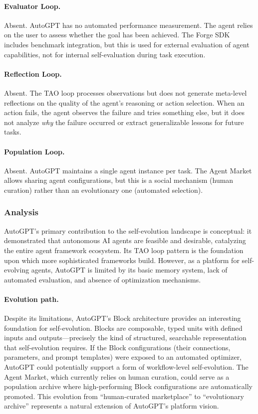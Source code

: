 \paragraph{Evaluator Loop.}
Absent. AutoGPT has no automated performance measurement. The agent relies on the user to assess whether the goal has been achieved. The Forge SDK includes benchmark integration, but this is used for external evaluation of agent capabilities, not for internal self-evaluation during task execution.

\paragraph{Reflection Loop.}
Absent. The TAO loop processes observations but does not generate meta-level reflections on the quality of the agent's reasoning or action selection. When an action fails, the agent observes the failure and tries something else, but it does not analyze \emph{why} the failure occurred or extract generalizable lessons for future tasks.

\paragraph{Population Loop.}
Absent. AutoGPT maintains a single agent instance per task. The Agent Market allows sharing agent configurations, but this is a social mechanism (human curation) rather than an evolutionary one (automated selection).

\subsubsection{Analysis}

AutoGPT's primary contribution to the self-evolution landscape is conceptual: it demonstrated that autonomous AI agents are feasible and desirable, catalyzing the entire agent framework ecosystem. Its TAO loop pattern is the foundation upon which more sophisticated frameworks build. However, as a platform for self-evolving agents, AutoGPT is limited by its basic memory system, lack of automated evaluation, and absence of optimization mechanisms.

\paragraph{Evolution path.}
Despite its limitations, AutoGPT's Block architecture provides an interesting foundation for self-evolution. Blocks are composable, typed units with defined inputs and outputs---precisely the kind of structured, searchable representation that self-evolution requires. If the Block configurations (their connections, parameters, and prompt templates) were exposed to an automated optimizer, AutoGPT could potentially support a form of workflow-level self-evolution. The Agent Market, which currently relies on human curation, could serve as a population archive where high-performing Block configurations are automatically promoted. This evolution from ``human-curated marketplace'' to ``evolutionary archive'' represents a natural extension of AutoGPT's platform vision.

